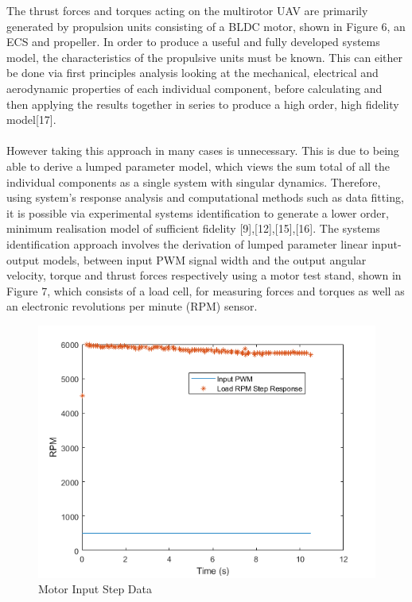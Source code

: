 \documentclass[12pt,a4paper,twoside]{report}
\begin{document}
				The thrust forces and torques acting on the multirotor UAV are primarily generated by propulsion units consisting of a BLDC motor, shown in Figure 6, an ECS and propeller. In order to produce a useful and fully developed systems model, the characteristics of the propulsive units must be known. This can either be done via first principles analysis looking at the mechanical, electrical and aerodynamic properties of each individual component, before calculating and then applying the results together in series to produce a high order, high fidelity model[17]. 
				\\ \\
				However taking this approach in many cases is unnecessary. This is due to being able to derive a lumped parameter model, which views the sum total of all the individual components as a single system with singular dynamics. Therefore, using system's response analysis and computational methods such as data fitting, it is possible via experimental systems identification to generate a lower order, minimum realisation model of sufficient fidelity [9],[12],[15],[16]. The systems identification approach involves the derivation of lumped parameter linear input-output models, between input PWM signal width and the output angular velocity, torque and thrust forces respectively using a motor test stand, shown in Figure 7, which consists of a load cell, for measuring forces and torques as well as an electronic revolutions per minute (RPM) sensor.
				\\
				\begin{figure}[h!]
					\centering
					\includegraphics[width=0.8\linewidth]{InputStepData.png}
					\caption{Motor Input Step Data}
					\label{fig:inputstepdata}
				\end{figure}
				\\
\end{document}
